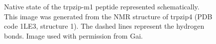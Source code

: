 \begin{figure}[ht]
\caption{Native state of the trpzip-m1 peptide represented schematically. 
This image was generated from the NMR structure of trpzip4 (PDB code 1LE3, structure 1). The dashed lines represent the hydrogen bonds. Image used with permission from Gai.\cite{du_understanding_2006}}
\end{figure}

